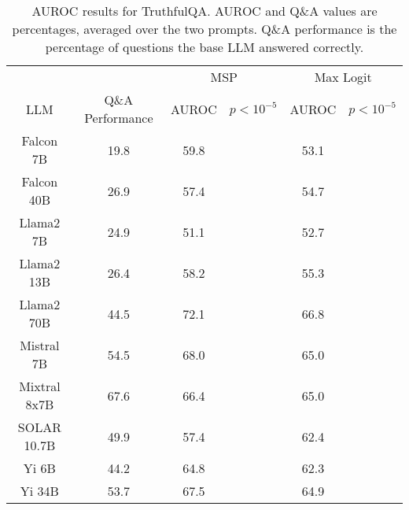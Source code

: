 \begin{table*}
\centering
\begin{tabular}{c|c|c|c|c|c}
& & \multicolumn{2}{c|}{MSP} & \multicolumn{2}{c}{Max Logit} \\ 
LLM & Q\&A Performance & AUROC & $p < 10^{-5}$ & AUROC & $p < 10^{-5}$\\ \hline
Falcon 7B & 19.8 & 59.8 &  & 53.1 & \\
Falcon 40B & 26.9 & 57.4 &  & 54.7 & \\
Llama2 7B & 24.9 & 51.1 &  & 52.7 & \\
Llama2 13B & 26.4 & 58.2 &  & 55.3 & \\
Llama2 70B & 44.5 & 72.1 &  & 66.8 & \\
Mistral 7B & 54.5 & 68.0 &  & 65.0 & \\
Mixtral 8x7B & 67.6 & 66.4 &  & 65.0 & \\
SOLAR 10.7B & 49.9 & 57.4 &  & 62.4 & \\
Yi 6B & 44.2 & 64.8 &  & 62.3 & \\
Yi 34B & 53.7 & 67.5 &  & 64.9 & \\
\hline
\end{tabular}
\caption{AUROC results for TruthfulQA. AUROC and Q\&A values are percentages, averaged over the two prompts. Q\&A performance is the percentage of questions the base LLM answered correctly.}
\label{tab:truthfulqa_auroc}
\end{table*}
